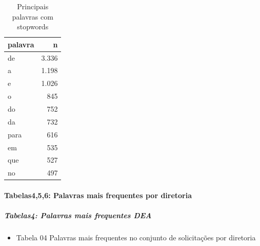 \documentclass[]{article}
\providecommand{\tightlist}{%
  \setlength{\itemsep}{0pt}\setlength{\parskip}{0pt}}
\let\oldparagraph\paragraph
\renewcommand{\paragraph}[1]{\oldparagraph{#1}\mbox{}}
\let\oldsubparagraph\subparagraph
\renewcommand{\subparagraph}[1]{\oldsubparagraph{#1}\mbox{}}
\begin{document}
\begin{table}[!h]

\caption{\label{tab:unnamed-chunk-23}Principais palavras com stopwords}
\centering
\begin{tabular}{lr}
\toprule
palavra & n\\
\midrule
\rowcolor{gray!6}  de & 3.336\\
a & 1.198\\
\rowcolor{gray!6}  e & 1.026\\
o & 845\\
\rowcolor{gray!6}  do & 752\\
\addlinespace
da & 732\\
\rowcolor{gray!6}  para & 616\\
em & 535\\
\rowcolor{gray!6}  que & 527\\
no & 497\\
\bottomrule
\end{tabular}
\end{table}

\paragraph{Tabelas4,5,6: Palavras mais frequentes por
diretoria}\label{tabelas456-palavras-mais-frequentes-por-diretoria}

\subparagraph{Tabelas4: Palavras mais frequentes
DEA}\label{tabelas4-palavras-mais-frequentes-dea}

\begin{itemize}
\tightlist
\item
  Tabela 04 Palavras mais frequentes no conjunto de solicitações por
  diretoria
\end{itemize}
\end{document}
